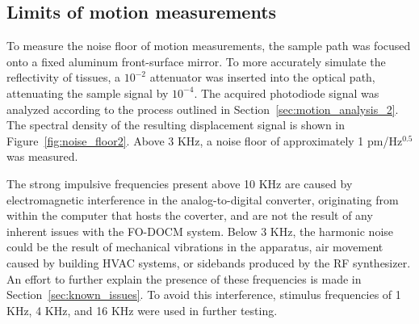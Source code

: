 \subsection{Limits of motion measurements}

To measure the noise floor of motion measurements, the sample path was focused onto a fixed aluminum front-surface mirror. 
To more accurately simulate the reflectivity of tissues, a $10^{-2}$ attenuator was inserted into the optical path, attenuating the sample signal by $10^{-4}$. The acquired photodiode signal was analyzed according to the process outlined in Section~\ref{sec:motion_analysis_2}. The spectral density of the resulting displacement signal is shown in Figure~\ref{fig:noise_floor2}.
Above 3 KHz, a noise floor of approximately 1 pm/Hz$^{0.5}$ was measured.

The strong impulsive frequencies present above 10 KHz are caused by electromagnetic interference in the analog-to-digital converter, originating from within the computer that hosts the coverter, and are not the result of any inherent issues with the FO-DOCM system. Below 3 KHz, the harmonic noise could be the result of mechanical vibrations in the apparatus, air movement caused by building HVAC systems, or sidebands produced by the RF synthesizer. An effort to further explain the presence of these frequencies is made in Section~\ref{sec:known_issues}. To avoid this interference, stimulus frequencies of 1 KHz, 4 KHz, and 16 KHz were used in further testing. %


